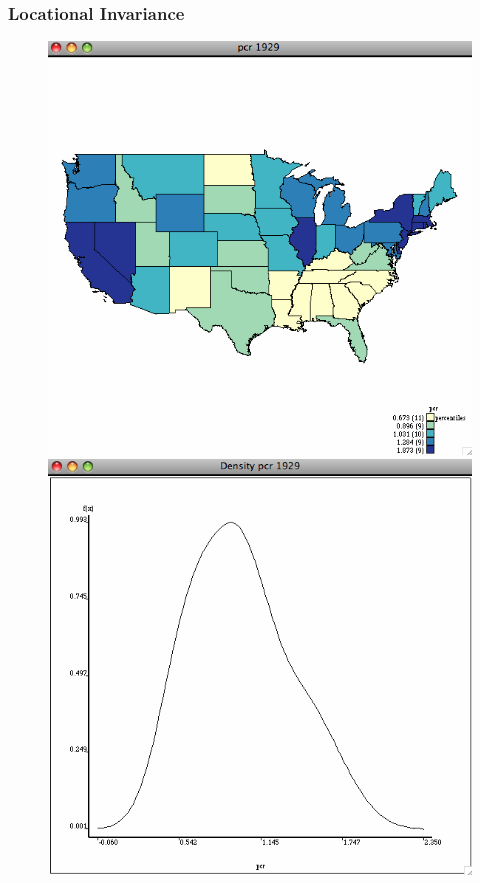 \documentclass[nototal]{beamer}
\begin{document}
\begin{frame}
	\frametitle{Locational Invariance}
 \begin{figure}[ht]
  \begin{minipage}[b]{0.4\linewidth}
  \centering
  \includegraphics[scale=0.20]{income29.png}
  \end{minipage}
  \begin{minipage}[b]{0.4\linewidth}
  \centering
  \includegraphics[scale=0.20]{density29.png}

\end{minipage}
\end{figure}
\end{frame}
\end{document}
